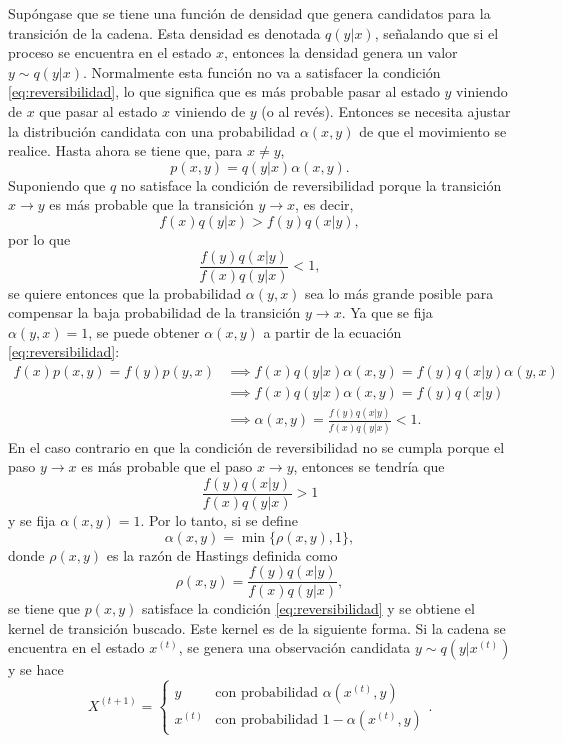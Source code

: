 \documentclass[11pt,a4paper]{article}
\begin{document}
Supóngase que se tiene una función de densidad que genera candidatos para la transición de la cadena. Esta densidad es denotada $q(y|x)$, señalando que si el proceso se encuentra en el estado $x$, entonces la densidad genera un valor $y \sim q(y|x)$. Normalmente esta función no va a satisfacer la condición \eqref{eq:reversibilidad}, lo que significa que es más probable pasar al estado $y$ viniendo de $x$ que pasar al estado $x$ viniendo de $y$ (o al revés). Entonces se necesita ajustar la distribución candidata con una probabilidad $\alpha (x, y)$ de que el movimiento se realice. Hasta ahora se tiene que, para $x \neq y$, $$p(x, y) = q(y | x) \alpha (x, y).$$ Suponiendo que $q$ no satisface la condición de reversibilidad porque la transición $x \to y$ es más probable que la transición $y \to x$, es decir, $$f(x)q(y|x) > f(y)q(x|y),$$ por lo que $$\frac{f(y)q(x|y)}{f(x)q(y|x)} < 1,$$ se quiere entonces que la probabilidad $\alpha(y, x)$ sea lo más grande posible para compensar la baja probabilidad de la transición $y \to x$. Ya que se fija $\alpha(y, x) = 1$, se puede obtener $\alpha(x, y)$ a partir de la ecuación \eqref{eq:reversibilidad}:
\begin{align*}
f(x)p(x, y) = f(y) p(y, x) &\implies f(x) q(y|x) \alpha(x, y) = f(y) q(x|y)\alpha (y, x)\\
&\implies f(x) q(y|x) \alpha(x, y) = f(y) q(x|y)\\
&\implies \alpha(x, y) = \frac{f(y)q(x|y)}{f(x)q(y|x)} < 1.
\end{align*}
En el caso contrario en que la condición de reversibilidad no se cumpla porque el paso $y \to x$ es más probable que el paso $x \to y$, entonces se tendría que $$\frac{f(y)q(x|y)}{f(x)q(y|x)} > 1$$ y se fija $\alpha(x, y) = 1$. Por lo tanto, si se define
\begin{equation}
\label{eq:prob_transicion}
\alpha(x, y) = \min \lbrace \rho(x, y), 1 \rbrace,
\end{equation}
donde $\rho(x, y)$ es la razón de Hastings definida como $$\rho(x, y) = \frac{f(y)q(x|y)}{f(x)q(y|x)},$$ se tiene que $p(x, y)$ satisface la condición \eqref{eq:reversibilidad} y se obtiene el kernel de transición buscado. Este kernel es de la siguiente forma. Si la cadena se encuentra en el estado $x^{(t)}$, se genera una observación candidata $y \sim q(y|x^{(t)})$ y se hace
\begin{equation}
\label{eq:mh}
X^{(t+1)} = \begin{cases} 
      y & \text{con probabilidad } \alpha(x^{(t)}, y)\\
      x^{(t)} & \text{con probabilidad } 1-\alpha(x^{(t)}, y)
   \end{cases}.
\end{equation}
\end{document}
